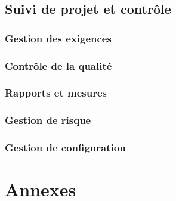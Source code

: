 \documentclass[a4paper,10pt,twoside]{article}
\begin{document}
\subsection{Suivi de projet et contrôle}
\subsubsection{Gestion des exigences}
\subsubsection{Contrôle de la qualité}
\subsubsection{Rapports et mesures}
\subsubsection{Gestion de risque}
\subsubsection{Gestion de configuration}
\section{Annexes}
\end{document}
